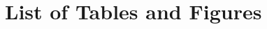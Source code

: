
\chapter{List of Tables and Figures} %

\label{AppendixB} %

\listoftables %
\label{lst:tabs}

\listoffigures %
\label{lst:figs}


%
%

